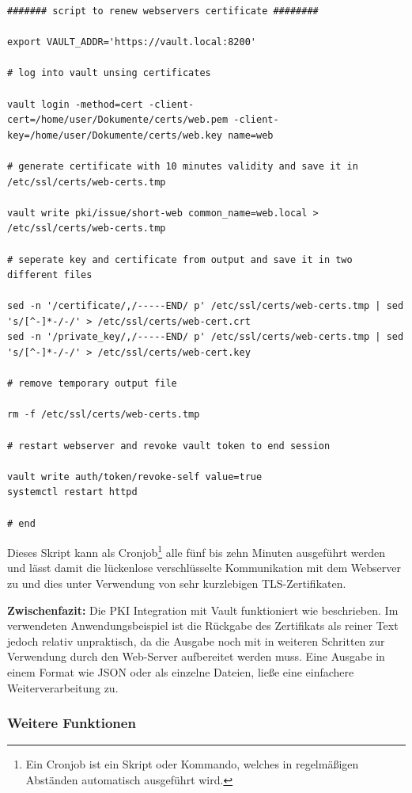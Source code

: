 \documentclass[
book,
a4paper,   
titlepage,  
halfparskip,
12pt        
]{scrartcl}
\begin{document}
\begin{onehalfspacing}
\begin{lstlisting}[caption={[Skript PKI] Shell Skript zum Erstellen eines neuen Benutzerzertifikats unter Verwendung der Vault \ac{PKI}}, label=lst:skript, captionpos=b, basicstyle=\ttfamily]
####### script to renew webservers certificate ########

export VAULT_ADDR='https://vault.local:8200'

# log into vault unsing certificates

vault login -method=cert -client-cert=/home/user/Dokumente/certs/web.pem -client-key=/home/user/Dokumente/certs/web.key name=web

# generate certificate with 10 minutes validity and save it in /etc/ssl/certs/web-certs.tmp

vault write pki/issue/short-web common_name=web.local > /etc/ssl/certs/web-certs.tmp

# seperate key and certificate from output and save it in two different files

sed -n '/certificate/,/-----END/ p' /etc/ssl/certs/web-certs.tmp | sed 's/[^-]*-/-/' > /etc/ssl/certs/web-cert.crt
sed -n '/private_key/,/-----END/ p' /etc/ssl/certs/web-certs.tmp | sed 's/[^-]*-/-/' > /etc/ssl/certs/web-cert.key

# remove temporary output file

rm -f /etc/ssl/certs/web-certs.tmp

# restart webserver and revoke vault token to end session

vault write auth/token/revoke-self value=true
systemctl restart httpd

# end

\end{lstlisting}

Dieses Skript kann als Cronjob\footnote{Ein Cronjob ist ein Skript oder Kommando, welches in regelmäßigen Abständen automatisch ausgeführt wird.} alle fünf bis zehn Minuten ausgeführt werden und lässt damit die lückenlose verschlüsselte Kommunikation mit dem Webserver zu und dies unter Verwendung von sehr kurzlebigen \ac{TLS}-Zertifikaten. 

\textbf{Zwischenfazit:} Die PKI Integration mit Vault funktioniert wie beschrieben. Im verwendeten Anwendungsbeispiel ist die Rückgabe des Zertifikats als reiner Text jedoch relativ unpraktisch, da die Ausgabe noch mit in weiteren Schritten zur Verwendung durch den Web-Server aufbereitet werden muss. Eine Ausgabe in einem Format wie \ac{JSON} oder als einzelne Dateien, ließe eine einfachere Weiterverarbeitung zu.

\subsubsection{Weitere Funktionen}


\end{onehalfspacing}
\end{document}
